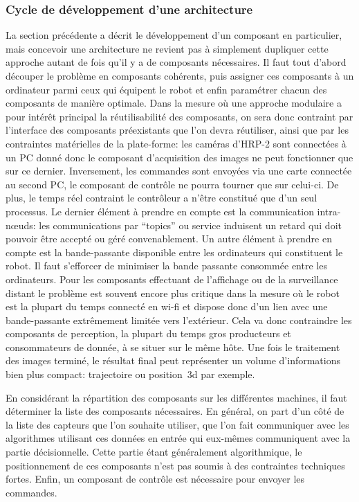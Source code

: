 \subsubsection{Cycle de développement d'une architecture}


La section précédente a décrit le développement d'un composant en
particulier, mais concevoir une architecture ne revient pas à
simplement dupliquer cette approche autant de fois qu'il y a de
composants nécessaires. Il faut tout d'abord découper le problème en
composants cohérents, puis assigner ces composants à un ordinateur
parmi ceux qui équipent le robot et enfin paramétrer chacun des
composants de manière optimale. Dans la mesure où une approche
modulaire a pour intérêt principal la réutilisabilité des composants,
on sera donc contraint par l'interface des composants préexistants que
l'on devra réutiliser, ainsi que par les contraintes matérielles de la
plate-forme: les caméras d'HRP-2 sont connectées à un PC donné donc le
composant d'acquisition des images ne peut fonctionner que sur ce
dernier. Inversement, les commandes sont envoyées via une carte
connectée au second PC, le composant de contrôle ne pourra tourner que
sur celui-ci. De plus, le temps réel contraint le contrôleur a n'être
constitué que d'un seul processus. Le dernier élément à prendre en
compte est la communication intra-n\oe uds: les communications par
``topics'' ou service induisent un retard qui doit pouvoir être
accepté ou géré convenablement. Un autre élément à prendre en compte
est la bande-passante disponible entre les ordinateurs qui constituent
le robot. Il faut s'efforcer de minimiser la bande passante consommée
entre les ordinateurs. Pour les composants effectuant de l'affichage
ou de la surveillance distant le problème est souvent encore plus
critique dans la mesure où le robot est la plupart du temps connecté
en wi-fi et dispose donc d'un lien avec une bande-passante extrêmement
limitée vers l'extérieur. Cela va donc contraindre les
composants de perception, la plupart du temps gros producteurs et
consommateurs de donnée, à se situer sur le même hôte. Une fois le
traitement des images terminé, le résultat final peut représenter un
volume d'informations bien plus compact: trajectoire ou position 3d par
exemple.


En considérant la répartition des composants sur les différentes
machines, il faut déterminer la liste des composants nécessaires. En
général, on part d'un côté de la liste des capteurs que l'on souhaite
utiliser, que l'on fait communiquer avec les algorithmes utilisant ces
données en entrée qui eux-mêmes communiquent avec la partie
décisionnelle. Cette partie étant généralement algorithmique, le
positionnement de ces composants n'est pas soumis à des contraintes
techniques fortes. Enfin, un composant de contrôle est nécessaire pour
envoyer les commandes.



